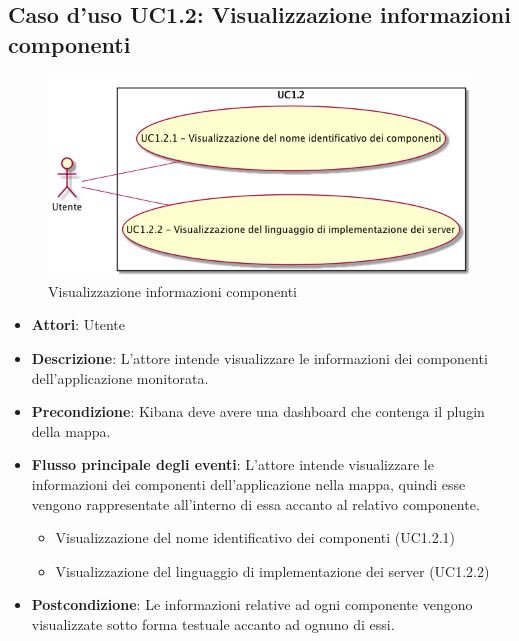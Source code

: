 \subsection{Caso d'uso UC1.2: Visualizzazione informazioni componenti}
\begin{figure} [H]
	\centering
	\includegraphics[scale=0.45]{./UC/UC1-2.png}
	\caption{Visualizzazione informazioni componenti}\label{}
\end{figure}
\begin{itemize}
	\item \textbf{Attori}: Utente
	\item \textbf{Descrizione}: L'attore intende visualizzare le informazioni dei componenti dell'applicazione monitorata.
	\item \textbf{Precondizione}: Kibana deve avere una dashboard che contenga il plugin della mappa.
	\item \textbf{Flusso principale degli eventi}: L'attore intende visualizzare le informazioni dei componenti dell'applicazione nella mappa, quindi esse vengono rappresentate all'interno di essa accanto al relativo componente.
	\begin{itemize}
		\item Visualizzazione del nome identificativo dei componenti (UC1.2.1)
		\item Visualizzazione del linguaggio di implementazione dei server (UC1.2.2)
	\end{itemize}
	\item \textbf{Postcondizione}: Le informazioni relative ad ogni componente vengono visualizzate sotto forma testuale accanto ad ognuno di essi.
\end{itemize}
